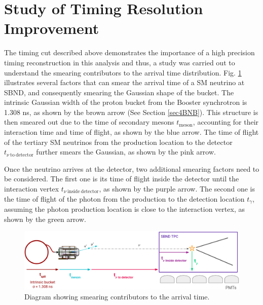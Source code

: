 \section{Study of Timing Resolution Improvement}
\label{sec:truth_bucket}

The timing cut described above demonstrates the importance of a high precision timing reconstruction in this analysis and thus, a study was carried out to understand the smearing contributors to the arrival time distribution. 
Fig. \ref{fig:smearing_factors} illustrates several factors that can smear the arrival time of a SM neutrino at SBND, and consequently smearing the Gaussian shape of the bucket.
The intrinsic Gaussian width of the proton bucket from the Booster synchrotron is 1.308 ns, as shown by the brown arrow (See Section \ref{sec4BNB}).
This structure is then smeared out due to the time of secondary mesons $t_{\mathrm{meson}}$, accounting for their interaction time and time of flight, as shown by the blue arrow.
The time of flight of the tertiary SM neutrinos from the production location to the detector $t_{\nu\ \mathrm{to\ detector}}$ further smears the Gaussian, as shown by the pink arrow.

Once the neutrino arrives at the detector, two additional smearing factors need to be considered.
The first one is its time of flight inside the detector until the interaction vertex $t_{\nu\ \mathrm{inside\ detector}}$, as shown by the purple arrow.
The second one is the time of flight of the photon from the production to the detection location $t_{\gamma}$, assuming the photon production location is close to the interaction vertex, as shown by the green arrow.

\begin{figure}[h!]
    \centering
    \includegraphics[width=1.0\textwidth]{smearing_factors.png}
    \caption[Smearing Contributors to the Arrival Time]{Diagram showing smearing contributors to the arrival time.}
    \label{fig:smearing_factors}
\end{figure}

